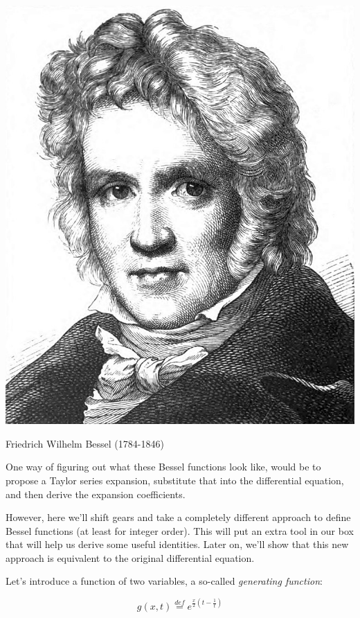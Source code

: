 \begin{marginfigure}[-0cm]
  \includegraphics{bessel/figures/f_bessel}
  \caption{Friedrich Wilhelm Bessel (1784-1846)}
\end{marginfigure}


One way of figuring out what these Bessel functions look like, would be to propose a Taylor series expansion, substitute that into the differential equation, and then derive the expansion coefficients.

However, here we'll shift gears and take a completely different approach to define Bessel functions (at least for integer order). This will put an extra tool in our box that will help us derive some useful identities. Later on, we'll show that this new approach is equivalent to the original differential equation.

Let's introduce a function of two variables, a so-called \emph{generating function}:

\begin{equation}
g(x,t) \stackrel{def}{=} e^{\frac{x}{2}\left(t-\frac{1}{t}\right)} \label{eq-gen-bessel}
\end{equation}


